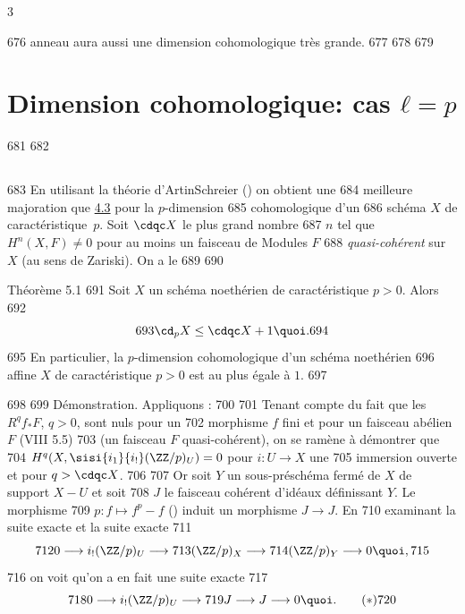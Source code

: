 3	\documentclass[10pt]{../fichiers-configuration-latex/smfart}
\begin{document}
   676	anneau aura aussi une dimension cohomologique très grande.
   677	%
   678	
   679	\section{Dimension cohomologique: cas $ℓ=p$}	
   681	\setcounter{subsection}{-1}
   682	\subsection{}
   683	En utilisant la théorie d'Artin\sisi{ - }{-}Schreier () on obtient une
   684	meilleure majoration que \hyperref[X.cor4.3]{4.3} pour la $p$-dimension
   685	cohomologique d'un 
   686	schéma $X$ de caractéristique $p$. Soit $\cdqc X$ le plus grand nombre
   687	$n$ tel que $H^n(X,F)\neq 0$ pour au moins un faisceau de Modules $F$
   688	\emph{quasi-cohérent} sur $X$ (au sens de Zariski). On a le
   689	
   690	\begin{enonce*}{Théorème 5.1}
   691	Soit $X$ un schéma noethérien de caractéristique $p>0$. Alors
   692	$$
   693	\cd_pX\leq \cdqc X+1{\quoi}.
   694	$$
   695	En particulier, la $p$-dimension cohomologique d'un schéma noethérien
   696	affine $X$ de caractéristique $p>0$ est au plus égale à $1$.
   697	\end{enonce*}
   698	
   699	Démonstration. Appliquons :
   700	
   701	Tenant compte du fait que les $R^q f_{\ast}F$, $q>0$, sont nuls pour un
   702	morphisme $f$ fini et pour un faisceau abélien $F$ (VIII 5.5) %
   703	(\resp un faisceau $F$ quasi-cohérent), on se ramène à démontrer que
   704	$H^q(X,\sisi{i_1}{i_!}(\ZZ/p)_U)=0$ pour $i:U\rightarrow X$ une
   705	immersion ouverte et pour $q>\cdqc X$.
   706	
   707	Or soit $Y$ un sous-préschéma fermé de $X$ de support $X-U$ et soit
   708	$J$ le faisceau cohérent d'idéaux définissant $Y$. Le morphisme
   709	$p:f\mapsto f^p-f$ () induit un morphisme $J\rightarrow J$. En
   710	examinant la suite exacte  et la suite exacte
   711	$$
   712	0\longrightarrow i_{!}(\ZZ/p)_U\longrightarrow
   713	(\ZZ/p)_X\longrightarrow
   714	(\ZZ/p)_Y\longrightarrow 0{\quoi},
   715	$$
   716	on voit qu'on a en fait une suite exacte
   717	\begin{equation*}
   718	0\longrightarrow i_{!}(\ZZ/p)_U\longrightarrow
   719	J\longrightarrow J\longrightarrow 0{\quoi}.\tag{$\ast$}
   720	\end{equation*}
\end{document}
